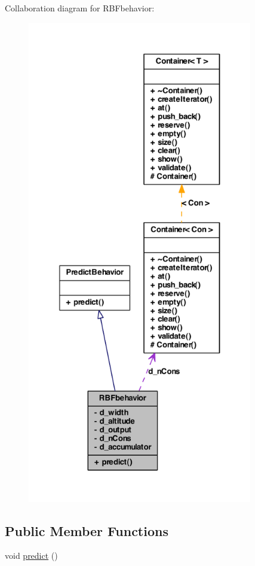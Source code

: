 Collaboration diagram for RBFbehavior:
\nopagebreak
\begin{figure}[H]
\begin{center}
\leavevmode
\includegraphics[height=600pt]{class_r_b_fbehavior__coll__graph}
\end{center}
\end{figure}
\subsection*{Public Member Functions}
\begin{DoxyCompactItemize}
\item 
void \hyperlink{class_r_b_fbehavior_ac14521848163e04810a6d038aef81896}{predict} ()
\end{DoxyCompactItemize}
